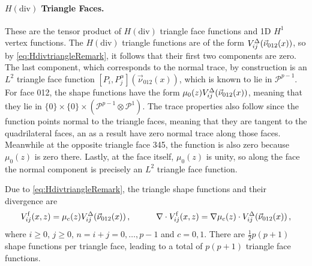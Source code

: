 \paragraph{\texorpdfstring{$H(\mathrm{div})$}{Hdiv} Triangle Faces.} 
These are the tensor product of $H(\mathrm{div})$ triangle face functions and 1D $H^1$ vertex functions. 
The $H(\mathrm{div})$ triangle functions are of the form $V_{ij}^\Delta(\vec{\nu}_{012}(x))$, so by \eqref{eq:HdivtriangleRemark}, it follows that their first two components are zero. 
The last component, which corresponds to the normal trace, by construction is an $L^2$ triangle face function $[P_i,P_j^\alpha](\vec{\nu}_{012}(x))$, which is known to lie in $\mathcal{P}^{p-1}$.
For face 012, the shape functions have the form $\mu_0(z)V_{ij}^\Delta(\vec{\nu}_{012}(x))$, meaning that they lie in $\{0\}\times\{0\}\times(\mathcal{P}^{p-1}\otimes\mathcal{P}^1)$.
The trace properties also follow since the function points normal to the triangle faces, meaning that they are tangent to the quadrilateral faces, an as a result have zero normal trace along those faces.
Meanwhile at the opposite triangle face 345, the function is also zero because $\mu_0(z)$ is zero there.
Lastly, at the face itself, $\mu_0(z)$ is unity, so along the face the normal component is precisely an $L^2$ triangle face function.

Due to \eqref{eq:HdivtriangleRemark}, the triangle shape functions and their divergence are
\begin{equation}
		V_{ij}^{\mathrm{f}}(x,z)=\mu_c(z)V_{ij}^\Delta(\vec{\nu}_{012}(x))\,,\qquad\quad
		\nabla\cdot V_{ij}^{\mathrm{f}}(x,z)=\nabla\mu_c(z)\cdot V_{ij}^\Delta(\vec{\nu}_{012}(x))\,,
\end{equation}
where $i\geq0$, $j\geq0$, $n=i+j=0,\ldots,p-1$ and $c=0,1$. There are $\frac{1}{2}p(p+1)$ shape functions per triangle face, leading to a total of $p(p+1)$ triangle face functions.

